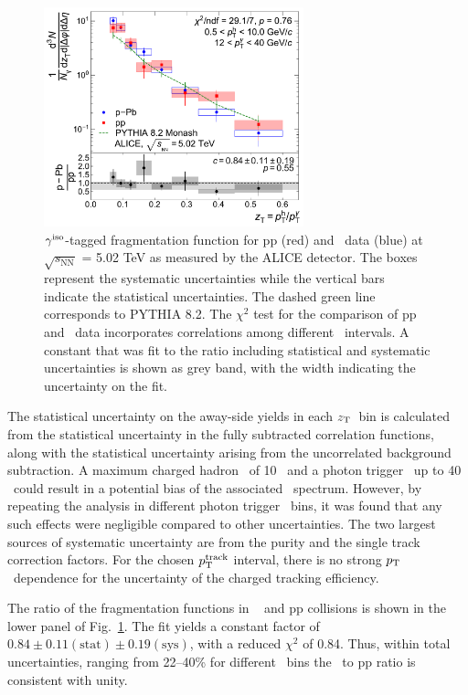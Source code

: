 \begin{figure}
    \centering
    \includegraphics[width=0.67\textwidth]{Data_Analysis/gammahadron/Final_FFunction_and_Ratio.pdf}
    \caption{$\gamma^\mathrm{iso}$-tagged fragmentation function for pp (red) and \pPb~data (blue) at $\sqrt{s_\mathrm{NN}}$ = 5.02 TeV as measured by the ALICE detector. The boxes represent the systematic uncertainties while the vertical bars indicate the statistical uncertainties. The dashed green line corresponds to \textsc{PYTHIA 8.2}. The $\chi^2$ test for the comparison of pp and \pPb~data incorporates correlations among different \zt~intervals. A constant that was fit to the ratio including statistical and systematic uncertainties is shown as grey band, with the width indicating the uncertainty on the fit.}
    \label{fig:Fragmentation_Functions}
\end{figure}

The statistical uncertainty on the away-side yields in each $z_{\mathrm{T}}$~bin is calculated from the statistical uncertainty in the fully subtracted correlation functions, along with the statistical uncertainty arising from the uncorrelated background subtraction. A maximum charged hadron \pt~of 10 \GeVc~and a photon trigger \pt~up to 40 \GeVc~could result in a potential bias of the associated \zt~spectrum. However, by repeating the analysis in different photon trigger \pt~bins, it was found that any such effects were negligible compared to other uncertainties. The two largest sources of systematic uncertainty are from the purity and the single track correction factors. For the chosen $p_{\mathrm{T}}^{\mathrm{track}}$ interval, there is no strong $p_{\mathrm{T}}$~dependence for the uncertainty of the charged tracking efficiency.

 The ratio of the fragmentation functions in \pPb~ and pp collisions is shown in the lower panel of Fig.~\ref{fig:Fragmentation_Functions}.
The fit yields a constant factor of $0.84\pm0.11\mathrm{(stat)}\pm0.19\mathrm{(sys)}$, with a reduced $\chi^{2}$ of 0.84.  
 Thus, within total uncertainties, ranging from 22--40\% for different \zt~bins the \pPb~to pp ratio is consistent with unity. %

